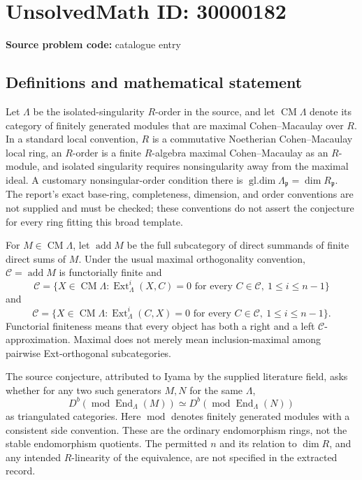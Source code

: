 \documentclass[11pt]{article}
\begin{document}
\section*{UnsolvedMath ID: 30000182}
\textbf{Source problem code:} catalogue entry
\subsection{Definitions and mathematical statement}
Let \(\Lambda\) be the isolated-singularity \(R\)-order in the source, and let \(\operatorname{CM}\Lambda\) denote its category of finitely generated modules that are maximal Cohen--Macaulay over \(R\). In a standard local convention, \(R\) is a commutative Noetherian Cohen--Macaulay local ring, an \(R\)-order is a finite \(R\)-algebra maximal Cohen--Macaulay as an \(R\)-module, and isolated singularity requires nonsingularity away from the maximal ideal. A customary nonsingular-order condition there is \(\operatorname{gl.dim}\Lambda_{\mathfrak p}=\dim R_{\mathfrak p}\). The report's exact base-ring, completeness, dimension, and order conventions are not supplied and must be checked; these conventions do not assert the conjecture for every ring fitting this broad template.

For \(M\in\operatorname{CM}\Lambda\), let \(\operatorname{add}M\) be the full subcategory of direct summands of finite direct sums of \(M\). Under the usual maximal orthogonality convention, \(\mathcal C=\operatorname{add}M\) is functorially finite and
\[
\mathcal C=\{X\in\operatorname{CM}\Lambda:\operatorname{Ext}^i_\Lambda(X,C)=0
\text{ for every }C\in\mathcal C,\ 1\leq i\leq n-1\}
\]
and
\[
\mathcal C=\{X\in\operatorname{CM}\Lambda:\operatorname{Ext}^i_\Lambda(C,X)=0
\text{ for every }C\in\mathcal C,\ 1\leq i\leq n-1\}.
\]
Functorial finiteness means that every object has both a right and a left \(\mathcal C\)-approximation. Maximal does not merely mean inclusion-maximal among pairwise Ext-orthogonal subcategories.

The source conjecture, attributed to Iyama by the supplied literature field, asks whether for any two such generators \(M,N\) for the same \(\Lambda\),
\[
D^b(\operatorname{mod}\operatorname{End}_\Lambda(M))
\simeq
D^b(\operatorname{mod}\operatorname{End}_\Lambda(N))
\]
as triangulated categories. Here \(\operatorname{mod}\) denotes finitely generated modules with a consistent side convention. These are the ordinary endomorphism rings, not the stable endomorphism quotients. The permitted \(n\) and its relation to \(\dim R\), and any intended \(R\)-linearity of the equivalence, are not specified in the extracted record.
\end{document}
